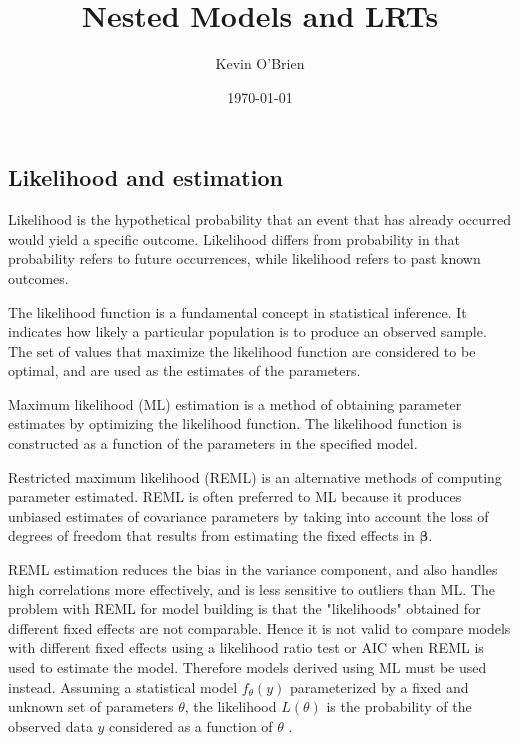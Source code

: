 \documentclass[12pt, a4paper]{article}
\begin{document}
\author{Kevin O'Brien}
\title{Nested Models and LRTs}
\date{\today}
\maketitle

\tableofcontents
\setcounter{tocdepth}{2}



\subsection*{Likelihood and estimation}

Likelihood is the hypothetical probability that an event that has already occurred would yield a specific outcome. Likelihood differs from probability in that probability refers to future occurrences, while likelihood refers to past known outcomes.

The likelihood function is a fundamental concept in statistical inference. It indicates how likely a particular population is to
produce an observed sample. The set of values that maximize the likelihood function are considered to be optimal, and are used as
the estimates of the parameters.

Maximum likelihood (ML) estimation is a method of obtaining parameter estimates by optimizing the likelihood function. The
likelihood function is constructed as a function of the parameters in the specified model.

Restricted maximum likelihood (REML) is an alternative methods of computing parameter estimated. REML is often preferred to ML
because it produces unbiased estimates of covariance parameters by taking into account the loss of degrees of freedom that results
from estimating the fixed effects in $\boldsymbol{\beta}$.

REML estimation reduces the bias in the variance component, and also handles high correlations
more effectively, and is less sensitive to outliers than ML.  The problem with REML for model building is that the "likelihoods" obtained for different fixed effects are not comparable. Hence it is not valid to compare models
with different fixed effects using a likelihood ratio test or AIC when REML is used to
estimate the model. Therefore models derived using ML must be used instead.
\bigskip
Assuming a statistical model $f_{\theta}(y)$ parameterized by a fixed and unknown set of parameters $\theta$, the likelihood $L(\theta)$ is the probability of the observed data $y$ considered as a function of $\theta$ \citep{youngjo}.
\end{document}
